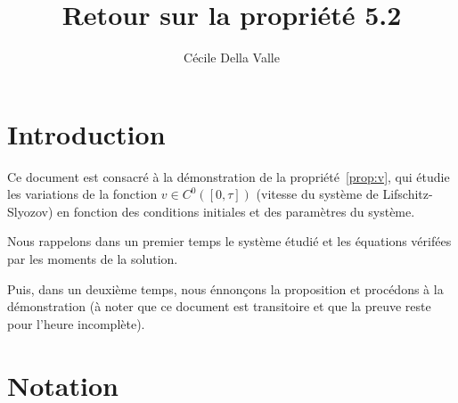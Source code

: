 \documentclass[a4paper]{article}
\title{Retour sur la propriété 5.2}
\author{Cécile Della Valle}
\begin{document}
\maketitle


\section{Introduction}

Ce document est consacré à la démonstration de la propriété~\ref{prop:v}, 
qui étudie les variations de la fonction $v \in C^0([0,\tau])$ 
(vitesse du système de Lifschitz-Slyozov) 
en fonction des conditions initiales et des paramètres du système.

Nous rappelons dans un premier temps le système étudié et les équations vérifées par les moments de la solution.

Puis, dans un deuxième temps, nous énnonçons la proposition et procédons à la démonstration 
(à noter que ce document est transitoire et que la preuve reste pour l'heure incomplète).


\section{Notation}
\end{document}
